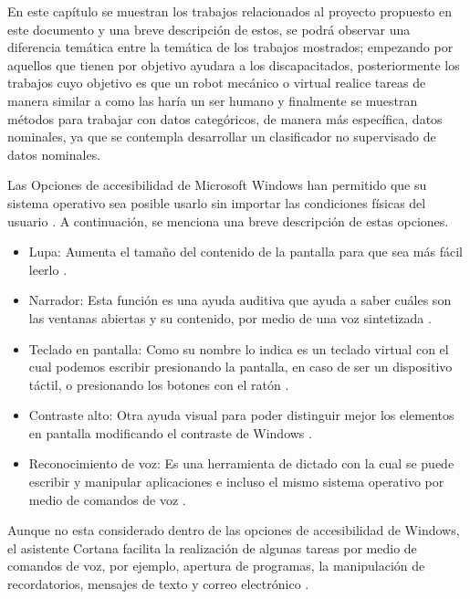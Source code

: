 En este capítulo se muestran los trabajos relacionados al proyecto propuesto
 en este documento y una breve descripción de estos, se podrá observar una
 diferencia temática entre la temática de los trabajos mostrados; empezando 
 por aquellos que tienen por objetivo ayudara a los discapacitados, 
 posteriormente los trabajos cuyo objetivo es que un robot mecánico o virtual 
 realice tareas de manera similar a como las haría un ser humano y finalmente 
 se muestran métodos para trabajar con datos categóricos, de manera más 
 específica, datos nominales, ya que se contempla desarrollar un clasificador 
 no supervisado de datos nominales.

Las Opciones de accesibilidad de Microsoft Windows han permitido que su
 sistema operativo sea posible usarlo sin importar las condiciones físicas del
 usuario \cite{DanielHubbell2016}. A continuación, se menciona una breve 
 descripción de estas opciones.

\begin{itemize}
	\item Lupa: Aumenta el tamaño del contenido de la pantalla para que sea más
	 fácil leerlo \cite{xatakaaccesiblilidad}.
	\item Narrador:  Esta función es una ayuda auditiva que ayuda a saber cuáles
	 son las ventanas abiertas y su contenido, por medio de una voz sintetizada
	 \cite{xatakaaccesiblilidad}.
	\item Teclado en pantalla: Como su nombre lo indica es un teclado virtual
	 con el cual podemos escribir presionando la pantalla, en caso de ser un
	 dispositivo táctil, o presionando los botones con el ratón
	 \cite{xatakaaccesiblilidad}.
	 \item Contraste alto: Otra ayuda visual para poder distinguir mejor los
	  elementos en pantalla modificando el contraste de Windows
	  \cite{xatakaaccesiblilidad}.
	  \item Reconocimiento de voz: Es una herramienta de dictado con la cual se
	   puede escribir y manipular aplicaciones e incluso el mismo sistema
	   operativo por medio de comandos de voz \cite{support14213}.
\end{itemize}
	   
Aunque no esta considerado dentro de las opciones de accesibilidad de Windows,
 el asistente Cortana facilita la realización de algunas tareas por medio de
 comandos de voz, por ejemplo, apertura de programas, la manipulación de
 recordatorios, mensajes de texto y correo electrónico \cite{support17214}. 

